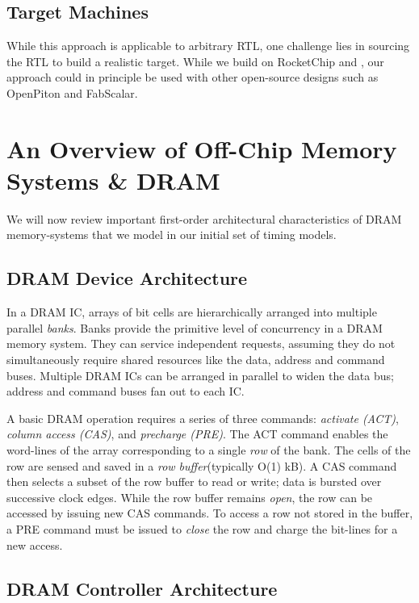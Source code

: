 \subsection{Target Machines}

While this approach is applicable to arbitrary RTL, one challenge lies in
sourcing the RTL to build a realistic target. While we build on RocketChip and
\RISCV, our approach could in principle be used with other open-source designs
such as OpenPiton\cite{openpiton} and FabScalar\cite{fabscalar}.


\clearpage
\section{An Overview of Off-Chip Memory Systems \& DRAM}

We will now review important first-order architectural
characteristics of DRAM memory-systems that we model in our initial set of
timing models.

\subsection{DRAM Device Architecture}
In a DRAM IC, arrays of bit cells are hierarchically arranged into multiple
parallel \textit{banks}. Banks provide the primitive level of concurrency in a
DRAM memory system. They can service independent requests, assuming they do not
simultaneously require shared resources like the data, address and command
buses.  Multiple DRAM ICs can be arranged in parallel to widen the data bus;
address and command buses fan out to each IC.

A basic DRAM operation requires a series of three commands: \textit{activate
(ACT)}, \textit{column access (CAS)}, and \textit{precharge (PRE)}. The ACT
command enables the word-lines of the array corresponding to a single
\textit{row} of the bank. The cells of the row are sensed and saved in a
\textit{row buffer}(typically O(1) kB). A CAS command then selects a subset of
the row buffer to read or write; data is bursted over successive clock edges.
While the row buffer remains \textit{open}, the row can be accessed by issuing
new CAS commands. To access a row not stored in the buffer, a PRE command must
be issued to \textit{close} the row and charge the bit-lines for a new access.

\subsection{DRAM Controller Architecture}

